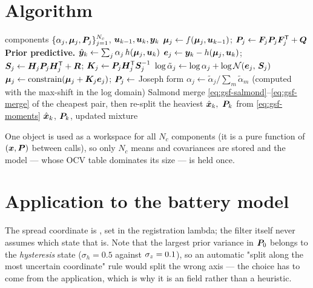 \section{Algorithm}
\begin{algorithm}[H]
\caption{GSF --- one sampling period}
\begin{algorithmic}[1]
\Require components $\{\alpha_j,\bm\mu_j,\bm{P}_j\}_{j=1}^{N_c}$, $\bm{u}_{k-1},\bm{u}_k,\bm{y}_k$
 
  \State $\bm\mu_j \gets f(\bm\mu_j,\bm{u}_{k-1})$; \quad $\bm{P}_j \gets \bm{F}_j\bm{P}_j\bm{F}_j^{\mathsf{T}} + \bm{Q}$
\EndFor
\State \textbf{Prior predictive.} $\hat{\bm{y}}_k \gets \sum_j \alpha_j\, h(\bm\mu_j,\bm{u}_k)$
 
  \State $\bm e_j \gets \bm{y}_k - h(\bm\mu_j,\bm{u}_k)$; \quad $\bm{S}_j \gets \bm{H}_j\bm{P}_j\bm{H}_j^{\mathsf{T}}+\bm{R}$; \quad $\bm{K}_j \gets \bm{P}_j\bm{H}_j^{\mathsf{T}}\bm{S}_j^{-1}$
  \State $\log\tilde\alpha_j \gets \log\alpha_j + \log\mathcal{N}\!\left(\bm e_j,\,\bm{S}_j\right)$
  \State $\bm\mu_j \gets \operatorname{constrain}(\bm\mu_j + \bm{K}_j\bm e_j)$; \quad $\bm{P}_j \gets$ Joseph form
\EndFor
\State $\alpha_j \gets \tilde\alpha_j/\sum_m\tilde\alpha_m$ (computed with the max-shift in the log domain)
 \State Salmond merge \eqref{eq:gsf-salmond}--\eqref{eq:gsf-merge} of the cheapest pair, then re-split the heaviest \EndIf
\State $\xhat_k,\ \mP_k$ from \eqref{eq:gsf-moments}
\Ensure $\hat{\bm{x}}_k$, $\bm{P}_k$, updated mixture
\end{algorithmic}
\end{algorithm}

\noindent One  object is used as a workspace for all $N_c$ components (it is a pure
function of $(\bm{x},\bm{P})$ between calls), so only $N_c$ means and covariances are stored and the model
--- whose OCV table dominates its size --- is held once.

\section{Application to the battery model}
The spread coordinate is , set in the registration lambda; the filter itself
never assumes which state that is.  Note that the largest prior variance in $\bm{P}_0$ belongs to the
\emph{hysteresis} state ($\sigma_h = 0.5$ against $\sigma_{z} = 0.1$), so an automatic "split
along the most uncertain coordinate" rule would split the wrong axis --- the choice has to come from
the application, which is why it is an  field rather than a heuristic.

